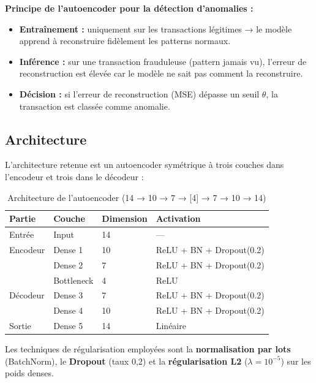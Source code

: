 \documentclass[12pt,a4paper,twoside]{report}
\begin{document}
\begin{definitionbox}
\textbf{Principe de l'autoencoder pour la détection d'anomalies :}
\begin{itemize}
  \item \textbf{Entraînement :} uniquement sur les transactions légitimes → le modèle apprend à reconstruire fidèlement les patterns normaux.
  \item \textbf{Inférence :} sur une transaction frauduleuse (pattern jamais vu), l'erreur de reconstruction est élevée car le modèle ne sait pas comment la reconstruire.
  \item \textbf{Décision :} si l'erreur de reconstruction (MSE) dépasse un seuil $\theta$, la transaction est classée comme anomalie.
\end{itemize}
\end{definitionbox}

\subsection{Architecture}

L'architecture retenue est un autoencoder symétrique à trois couches dans l'encodeur et trois dans le décodeur :

\begin{table}[H]
\centering
\caption{Architecture de l'autoencoder (14 → 10 → 7 → [4] → 7 → 10 → 14)}
\label{tab:ae_architecture}
\begin{tabular}{llll}
\toprule
\textbf{Partie} & \textbf{Couche} & \textbf{Dimension} & \textbf{Activation} \\
\midrule
Entrée    & Input   & 14 & --- \\
Encodeur  & Dense 1 & 10 & ReLU + BN + Dropout(0.2) \\
          & Dense 2 & 7  & ReLU + BN + Dropout(0.2) \\
          & Bottleneck & 4 & ReLU \\
Décodeur  & Dense 3 & 7  & ReLU + BN + Dropout(0.2) \\
          & Dense 4 & 10 & ReLU + BN + Dropout(0.2) \\
Sortie    & Dense 5 & 14 & Linéaire \\
\bottomrule
\end{tabular}
\end{table}

Les techniques de régularisation employées sont la \textbf{normalisation par lots} (BatchNorm), le \textbf{Dropout} (taux 0,2) et la \textbf{régularisation L2} ($\lambda = 10^{-5}$) sur les poids denses.
\end{document}
